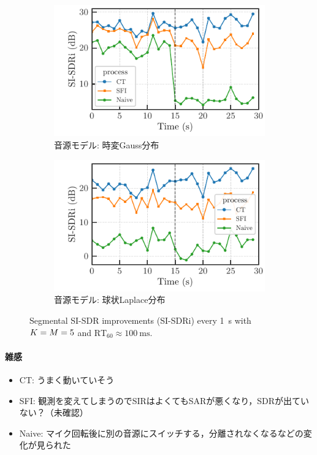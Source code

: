\documentclass[twocolumn,9pt,dvipdfmx]{article}
\begin{document}
\begin{figure}[t]
  \begin{subfigure}[t]{\columnwidth}
    \centering
    \includegraphics{figures/plots/batch/Gauss_8000.pdf}
    \caption{音源モデル: 時変Gauss分布}%
    \label{fig:plot:batch:gauss}
  \end{subfigure}%

  \begin{subfigure}[t]{\columnwidth}
    \centering
    \includegraphics{figures/plots/batch/Laplace_8000.pdf}
    \caption{音源モデル: 球状Laplace分布}%
    \label{fig:plot:batch:laplace}
  \end{subfigure}%
  \caption{Segmental SI-SDR improvements (SI-SDRi) every \SI{1}{\second} with $K = M = 5$ and $\text{RT}_{60} \approx \SI{100}{\milli\second}$.}
\end{figure}

\paragraph{雑感}
\begin{itemize}
  \item CT: うまく動いていそう
  \item SFI: 観測を変えてしまうのでSIRはよくてもSARが悪くなり，SDRが出ていない？（未確認）
  \item Naive: マイク回転後に別の音源にスイッチする，分離されなくなるなどの変化が見られた
\end{itemize}
\end{document}
